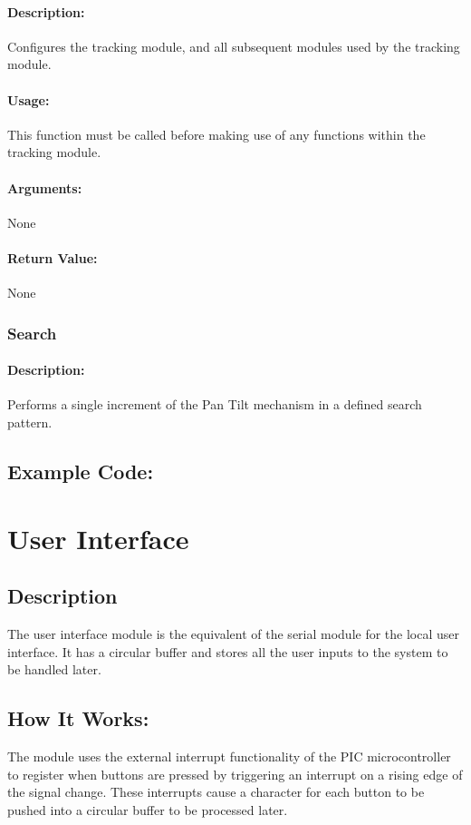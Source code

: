 \documentclass[]{report}
\begin{document}
\subsubsection{Description:}
Configures the tracking module, and all subsequent modules used by the tracking module.

\subsubsection{Usage:}
This function must be called before making use of any functions within the tracking module.

\subsubsection{Arguments:}
None

\subsubsection{Return Value:}
None

\subsection{Search}
\subsubsection{Description:}
Performs a single increment of the Pan Tilt mechanism in a defined search pattern.

\section{Example Code:}


\chapter{User Interface}
\section{Description}
The user interface module is the equivalent of the serial module for the local user interface. It has a circular buffer and stores all the user inputs to the system to be handled later.

\section{How It Works:}
The module uses the external interrupt functionality of the PIC microcontroller to register when buttons are pressed by triggering an interrupt on a rising edge of the signal change. These interrupts cause a character for each button to be pushed into a circular buffer to be processed later. 
\end{document}
